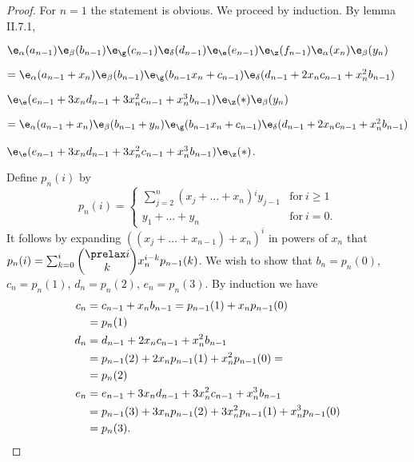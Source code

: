 \documentclass{memo-l}
\theoremstyle{definition}
\theoremstyle{remark}
\numberwithin{section}{chapter}
\numberwithin{equation}{chapter}
\begin{document}
\begin{proof}    For $n = 1$ the statement is obvious. 
 We proceed by induction.  By lemma II.7.1,

${\e}_{\alpha}(a_{n-1}){\e}_{\beta}(b_{n-1})
{\e}_{{\g}}(c_{n-1}){\e}_{{\delta}}(d_{n-1})
{\e}_{{\e}}(e_{n-1}){\e}_{{\z}}(f_{n-1})
{\e}_{\alpha}(x_{n}){\e}_{\beta}(y_{n})$

$= {\e}_{\alpha}(a_{n-1}+x_{n}){\e}_{\beta}(b_{n-1})
{\e}_{{\g}}(b_{n-1}x_{n}+c_{n-1}){\e}_{{\delta}}
(d_{n-1}+2x_{n}c_{n-1}+x_{n}^{2}b_{n-1})$

${\e}_{{\e}}(e_{n-1}+3x_{n}d_{n-1}+3x_{n}^{2}c_{n-1} + 
x_{n}^{3}b_{n-1}){\e}_{{\z}}(*){\e}_{\beta}(y_{n})$

$= {\e}_{\alpha}(a_{n-1}+x_{n}){\e}_{\beta}(b_{n-1}+y_{n})
{\e}_{{\g}}(b_{n-1}x_{n}+c_{n-1}){\e}_{{\delta}}(d_{n-1} + 
2x_{n}c_{n-1}+x_{n}^{2}b_{n-1})$

${\e}_{{\e}}(e_{n-1}+3x_{n}d_{n-1}+3x_{n}^{2}c_{n-1} + 
x_{n}^{3}b_{n-1}){\e}_{{\z}}(*)$.

\noindent
Define $p_{n}(i)$ by 
$$
p_n(i) = \begin{cases}
\sum^n_{j=2} (x_j +\ldots +x_n){}^iy_{j-1} & {\text{for}}\ i \ge 1 \\
y_{1} + \ldots + y_{n} & {\text{for}}\  i = 0   .
\end{cases}
$$
It follows by expanding $((x_{j}+\ldots +x_{n-1})+x_{n})^{i}$ in powers of 
$x_{n}$ that 
\newline
$p_{n}(i) = \sum^i_{k=0} {\begin{pmatrix} \prelax  i \\ k \end{pmatrix}} x_{n}^{i-k}p_{n-1}(k)$. 
 We wish to show that $b_{n} = p_{n}(0)$, $c_{n} = p_{n}(1)$, $d_{n} = p_{n}(2)$, 
$e_{n} = p_{n}(3)$. 
 By induction we have
$$
\aligned
c_{n} &= c_{n-1} + x_{n}b_{n-1} = p_{n-1}(1) + x_{n}p_{n-1}(0) \\
      &= p_{n}(1)\\
d_{n} &= d_{n-1}+2x_{n}c_{n-1}+x_{n}^{2}b_{n-1}  \\
      &= p_{n-1}(2)+2x_{n}p_{n-1}(1)+x_{n}^{2}p_{n-1}(0) = \\
      &= p_{n}(2) \\
e_{n} &= e_{n-1}+3x_{n}d_{n-1}+3x_{n}^{2}c_{n-1}+x_{n}^{3}b_{n-1} \\
      &= p_{n-1}(3)+3x_{n}p_{n-1}(2)+3x_{n}^{2}p_{n-1}(1)+x_{n}^{3}p_{n-1}(0) \\
      &= p_{n}(3). 
\endaligned
$$
\end{proof}
\end{document}

